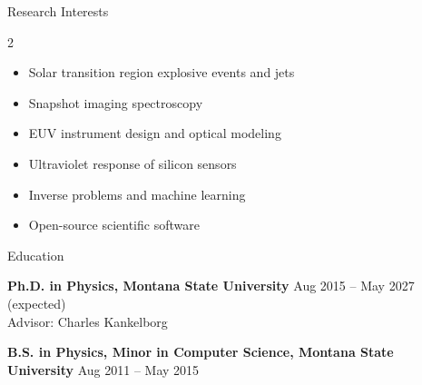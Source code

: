 \documentclass{resume}
\newcommand{\dated}[2]{\textbf{#1} \hfill {\fontseries{b}\selectfont #2}}
\begin{document}
\begin{rSection}{Research Interests}
	\begin{multicols}{2}
		\begin{itemize}[leftmargin=*, noitemsep, topsep=0pt]
			\item Solar transition region explosive events and jets
			\item Snapshot imaging spectroscopy
			\item EUV instrument design and optical modeling
			\item Ultraviolet response of silicon sensors
			\item Inverse problems and machine learning
			\item Open-source scientific software
		\end{itemize}
	\end{multicols}
\end{rSection}

\begin{rSection}{Education}

	\dated{Ph.D. in Physics, Montana State University}{Aug 2015 -- May 2027 (expected)}
	\\
	Advisor: Charles Kankelborg

	\dated{B.S. in Physics, Minor in Computer Science, Montana State University}{Aug 2011 -- May 2015}

\end{rSection}
\end{document}

